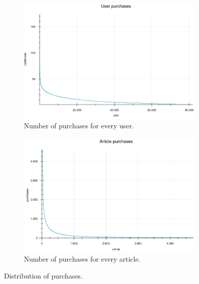 \documentclass[10pt]{reportMaster}
\begin{document}
\begin{figure}
	\begin{subfigure}[c]{1\textwidth}
		\centering
		\includegraphics[width=1\textwidth]{figures/experiments/userPurchases}
		\caption{Number of purchases for every user.}
		\label{fig:userPurchases}
	\end{subfigure}
	\begin{subfigure}[c]{1\textwidth}
		\centering
		\includegraphics[width=1\textwidth]{figures/experiments/articlePurchases}
		\caption{Number of purchases for every article.}
		\label{fig:articlePurchases}
	\end{subfigure}
	\caption{Distribution of purchases.}
\end{figure}
\end{document}
